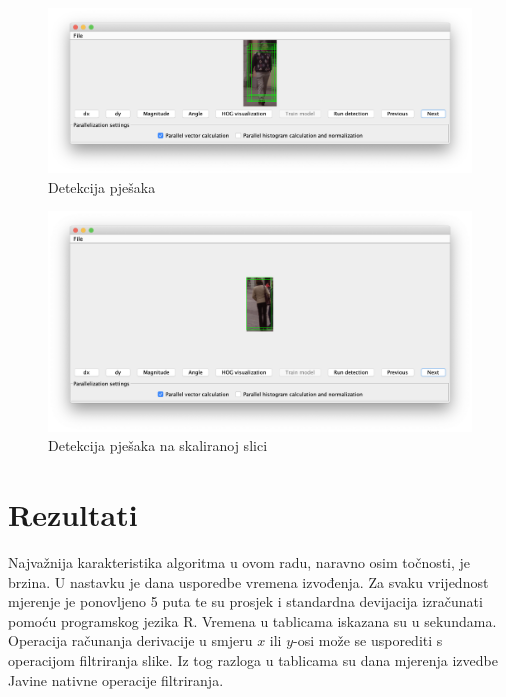 \documentclass[times, utf8, zavrsni]{fer}
\begin{document}
\begin{figure}[htb]
	\centering
	\includegraphics[width=\linewidth]{figures/detection.png}
	\caption{Detekcija pješaka}
	\label{fig:detection}
\end{figure}

\begin{figure}[htb]
	\centering
	\includegraphics[width=\linewidth]{figures/scaledDetection.png}
	\caption{Detekcija pješaka na skaliranoj slici}
	\label{fig:scaledDetection}
\end{figure}

\chapter{Rezultati}
Najvažnija karakteristika algoritma u ovom radu, naravno osim točnosti, je brzina. U nastavku je dana usporedbe vremena izvođenja. Za svaku vrijednost mjerenje je ponovljeno 5 puta te su prosjek i standardna devijacija izračunati pomoću programskog jezika R. Vremena u tablicama iskazana su u sekundama. \\

Operacija računanja derivacije u smjeru \(x\) ili \(y\)-osi može se usporediti s operacijom filtriranja slike. Iz tog razloga u tablicama su dana mjerenja izvedbe Javine nativne operacije filtriranja.
\end{document}
